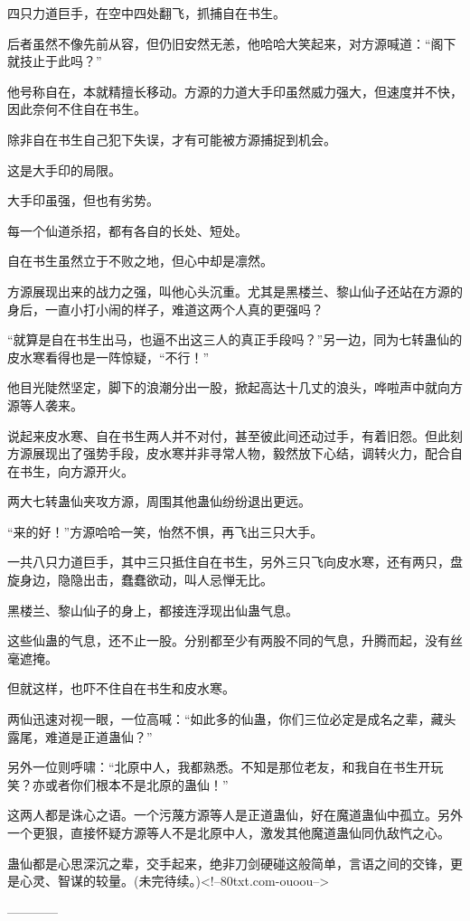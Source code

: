 \begin{this_body}
四只力道巨手，在空中四处翻飞，抓捕自在书生。

后者虽然不像先前从容，但仍旧安然无恙，他哈哈大笑起来，对方源喊道：“阁下就技止于此吗？”

他号称自在，本就精擅长移动。方源的力道大手印虽然威力强大，但速度并不快，因此奈何不住自在书生。

除非自在书生自己犯下失误，才有可能被方源捕捉到机会。

这是大手印的局限。

大手印虽强，但也有劣势。

每一个仙道杀招，都有各自的长处、短处。

自在书生虽然立于不败之地，但心中却是凛然。

方源展现出来的战力之强，叫他心头沉重。尤其是黑楼兰、黎山仙子还站在方源的身后，一直小打小闹的样子，难道这两个人真的更强吗？

“就算是自在书生出马，也逼不出这三人的真正手段吗？”另一边，同为七转蛊仙的皮水寒看得也是一阵惊疑，“不行！”

他目光陡然坚定，脚下的浪潮分出一股，掀起高达十几丈的浪头，哗啦声中就向方源等人袭来。

说起来皮水寒、自在书生两人并不对付，甚至彼此间还动过手，有着旧怨。但此刻方源展现出了强势手段，皮水寒并非寻常人物，毅然放下心结，调转火力，配合自在书生，向方源开火。

两大七转蛊仙夹攻方源，周围其他蛊仙纷纷退出更远。

“来的好！”方源哈哈一笑，怡然不惧，再飞出三只大手。

一共八只力道巨手，其中三只抵住自在书生，另外三只飞向皮水寒，还有两只，盘旋身边，隐隐出击，蠢蠢欲动，叫人忌惮无比。

黑楼兰、黎山仙子的身上，都接连浮现出仙蛊气息。

这些仙蛊的气息，还不止一股。分别都至少有两股不同的气息，升腾而起，没有丝毫遮掩。

但就这样，也吓不住自在书生和皮水寒。

两仙迅速对视一眼，一位高喊：“如此多的仙蛊，你们三位必定是成名之辈，藏头露尾，难道是正道蛊仙？”

另外一位则呼啸：“北原中人，我都熟悉。不知是那位老友，和我自在书生开玩笑？亦或者你们根本不是北原的蛊仙！”

这两人都是诛心之语。一个污蔑方源等人是正道蛊仙，好在魔道蛊仙中孤立。另外一个更狠，直接怀疑方源等人不是北原中人，激发其他魔道蛊仙同仇敌忾之心。

蛊仙都是心思深沉之辈，交手起来，绝非刀剑硬碰这般简单，言语之间的交锋，更是心灵、智谋的较量。(未完待续。)<!--80txt.com-ouoou-->

------------

\end{this_body}

